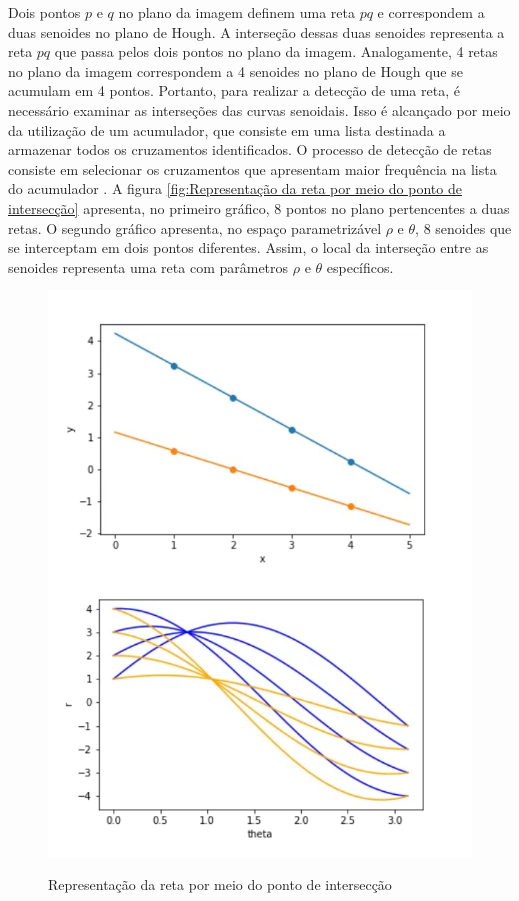 Dois pontos $p$ e $q$ no plano da imagem definem uma reta $pq$ e correspondem a duas senoides no plano de Hough. A interseção dessas duas senoides representa a reta $pq$ que passa pelos dois pontos no plano da imagem. Analogamente, 4 retas no plano da imagem correspondem a 4 senoides no plano de Hough que se acumulam em 4 pontos. Portanto, para realizar a detecção de uma reta, é necessário examinar as interseções das curvas senoidais. Isso é alcançado por meio da utilização de um acumulador, que consiste em uma lista destinada a armazenar todos os cruzamentos identificados. O processo de detecção de retas consiste em selecionar os cruzamentos que apresentam maior frequência na lista do acumulador \cite{transformadaHough2}. A figura \ref{fig:Representação da reta por meio do ponto de intersecção} apresenta, no primeiro gráfico, 8 pontos no plano pertencentes a duas retas. O segundo gráfico apresenta, no espaço parametrizável $\rho$ e $\theta$, 8 senoides que se interceptam em dois pontos diferentes. Assim, o local da interseção entre as senoides representa uma reta com parâmetros $\rho$ e $\theta$ específicos.


\begin{figure}[H]
	\centering
    \caption{Representação da reta por meio do ponto de intersecção}
	\includegraphics[scale=0.5]{figuras/math/senoidesIterseccao.png}
	\label{fig:Representacao da reta por meio do ponto de interseccao}
\end{figure}




